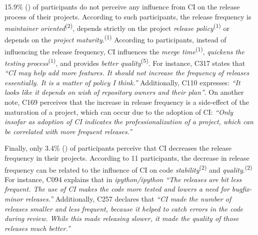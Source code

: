 15.9\% ()  of participants do not perceive any influence from CI on the release process of their projects. According to such participants, the release frequency is \textit{maintainer oriented}\textsuperscript{(2)}, depends strictly on the project \textit{release policy}\textsuperscript{(1)} or depends on the \textit{project maturity}.\textsuperscript{(1)} According to participants, instead of influencing the release frequency, CI influences the \textit{merge time}\textsuperscript{(1)}, \textit{quickens the testing process}\textsuperscript{(1)}, and provides \textit{better quality}\textsuperscript{(5)}. For instance, C317 states that \textit{``CI may help add more features. It should not increase the frequency of releases essentially. It is a matter of policy I think.''} Additionally, C110 expresses: \textit{``It looks like it depends on wish of repository owners and their plan''}. On another note, C169 perceives that the increase in release frequency is a side-effect of the maturation of a project, which can occur due to the adoption of CI: \textit{``Only insofar as adoption of CI indicates the professionalization of a project, which can be correlated with more frequent releases.''} 

Finally, only 3.4\%  () of participants perceive that CI decreases the release frequency in their projects. According to 11 participants, the decrease in release frequency can be related to the influence of CI on code \textit{stability}\textsuperscript{(2)} and \textit{quality}.\textsuperscript{(2)} For instance, C094 explains that in \textit{ipython/ipython} \textit{``The releases are bit less frequent. The use of CI makes the code more tested and lowers a need for bugfix-minor releases.''} Additionally, C257 declares that \textit{``CI made the number of releases smaller and less frequent, because it helped to catch errors in the code during review. While this made releasing slower, it made the quality of those releases much better.''}  

